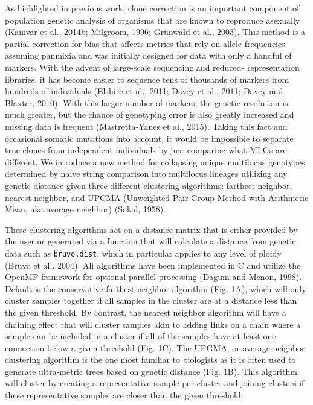 \documentclass{frontiersSCNS} %
\begin{document}
As highlighted in previous work, clone correction is an important
component of population genetic analysis of organisms that are known to
reproduce asexually (Kamvar et al., 2014b; Milgroom, 1996; Gr\"{u}nwald et
al., 2003). This method is a partial correction for bias that affects
metrics that rely on allele frequencies assuming panmixia and was
initially designed for data with only a handful of markers. With the
advent of large-scale sequencing and reduced- representation libraries,
it has become easier to sequence tens of thousands of markers from
hundreds of individuals (Elshire et al., 2011; Davey et al., 2011; Davey
and Blaxter, 2010). With this larger number of markers, the genetic
resolution is much greater, but the chance of genotyping error is also
greatly increased and missing data is frequent (Mastretta-Yanes et al.,
2015). Taking this fact and occasional somatic mutations into account,
it would be impossible to separate true clones from independent
individuals by just comparing what MLGs are different. We introduce a
new method for collapsing unique multilocus genotypes determined by
naive string comparison into multilocus lineages utilizing any genetic
distance given three different clustering algorithms: farthest neighbor,
nearest neighbor, and UPGMA (Unweighted Pair Group Method with
Arithmetic Mean, aka average neighbor) (Sokal, 1958).

These clustering algorithms act on a distance matrix that is either
provided by the user or generated via a function that will calculate a
distance from genetic data such as \texttt{bruvo.dist}, which in
particular applies to any level of ploidy (Bruvo et al., 2004). All
algorithms have been implemented in C and utilize the OpenMP framework
for optional parallel processing (Dagum and Menon, 1998). Default is the
conservative farthest neighbor algorithm (Fig. 1A), which will only
cluster samples together if all samples in the cluster are at a distance
less than the given threshold. By contrast, the nearest neighbor
algorithm will have a chaining effect that will cluster samples akin to
adding links on a chain where a sample can be included in a cluster if
all of the samples have at least one connection below a given threshold
(Fig. 1C). The UPGMA, or average neighbor clustering algorithm is the
one most familiar to biologists as it is often used to generate
ultra-metric trees based on genetic distance (Fig. 1B). This algorithm
will cluster by creating a representative sample per cluster and joining
clusters if these representative samples are closer than the given
threshold.
\end{document}
